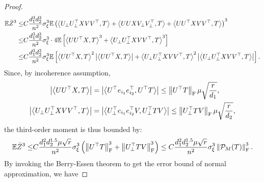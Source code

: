 \documentclass[12pt]{article}
\newcommand{\tF}{{\rm F}}
\newcommand{\abs}[1]{\left\lvert#1\right\rvert}
\newcommand{\norm}[1]{\left\lVert#1\right\rVert}
\newcommand{\E}{\mathbb{E}}
\newcommand{\cP}{\mathcal{P}}
\theoremstyle{plain}
\begin{document}
\begin{proof}
\begin{equation*}
    \begin{aligned}
        \E \Bar{Z}^3 \le & C \frac{d_1^{3} d_2^3}{n^2 } \sigma_{\xi}^3 \E \left(\left\langle U_{\perp} U_{\perp}^{\top} X V V^{\top}, T\right\rangle+\left\langle U U X V_{\perp} V_{\perp}^{\top}, T\right\rangle + \left\langle UU^{\top} X V V^{\top}, T\right\rangle \right)^3 \\
        \le & C\frac{d_1^{3} d_2^3}{n^2 } \sigma_{\xi}^3 \cdot 4 \E  \left[\left\langle UU^{\top} X, T\right\rangle^3 +\left\langle U_{\perp} U_{\perp}^{\top} X VV^\top, T\right\rangle^3 \right]\\
        \le & C\frac{d_1^{3} d_2^3}{n^2} \sigma_{\xi}^3  \E \left[\left\langle UU^{\top} X, T\right\rangle^2\abs{\left\langle UU^{\top} X, T\right\rangle } + \left\langle U_{\perp} U_{\perp}^{\top} X VV^\top, T\right\rangle^2 \abs{\left\langle U_{\perp} U_{\perp}^{\top} X VV^\top, T\right\rangle}\right]. \\
    \end{aligned}
\end{equation*}
Since, by incoherence assumption, 
\begin{equation*}
    \begin{aligned}
        \abs{\left\langle UU^{\top} X, T\right\rangle } &= \abs{\left\langle U^{\top} e_{i_1} e_{i_2}^\top, U^\top T\right\rangle } \le \norm{U^\top T}_{\tF} \mu \sqrt{ \frac{r}{d_1}}, \\
        \abs{\left\langle U_{\perp} U_{\perp}^{\top} X VV^\top, T\right\rangle} & = \abs{\left\langle  U_{\perp}^{\top} e_{i_1} e_{i_2}^\top V, U_{\perp}^{\top}T V \right\rangle} \le \norm{U_{\perp}^{\top}T V}_{\tF} \mu \sqrt{ \frac{r}{d_2}},
    \end{aligned}
\end{equation*}
the third-order moment is thus bounded by:
\begin{equation*}
    \begin{aligned}
    \E \Bar{Z}^3 \le & C\frac{d_1^{2} d_2^{1.5} \mu \sqrt{r} }{n^2 } \sigma_{\xi}^3  \left(\norm{U^\top T}_{\tF}^3  + \norm{U^\top_{\perp} TV }^3_{\tF} \right) \le  C\frac{d_1^{2} d_2^{1.5} \mu \sqrt{r} }{n^2 } \sigma_{\xi}^3 \norm{\cP_M(T) }_{\tF} ^{3}. \\
    \end{aligned}
\end{equation*}
By invoking the Berry-Essen theorem to get the error bound of normal approximation, we have


\end{proof}
\end{document}
